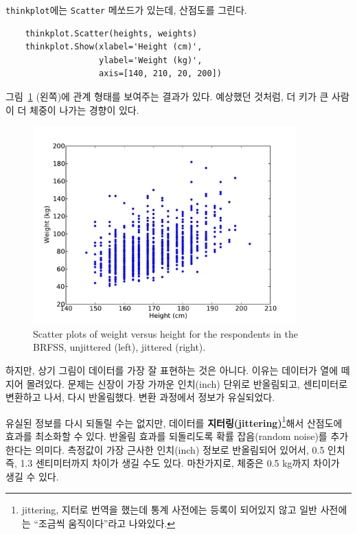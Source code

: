
{\tt thinkplot}에는 {\tt Scatter} 메쏘드가 있는데, 산점도를 그린다.
%
\begin{verbatim}
    thinkplot.Scatter(heights, weights)
    thinkplot.Show(xlabel='Height (cm)',
                   ylabel='Weight (kg)',
                   axis=[140, 210, 20, 200])
\end{verbatim}

그림~\ref{scatter1} (왼쪽)에 관계 형태를 보여주는 결과가 있다.
예상했던 것처럼, 더 키가 큰 사람이 더 체중이 나가는 경향이 있다.

\begin{figure}
\centerline{\includegraphics[height=3.0in]{figs/scatter1.pdf}}
\caption{Scatter plots of weight versus height for the respondents
in the BRFSS, unjittered (left), jittered (right).}
\label{scatter1}
\end{figure}

하지만, 상기 그림이 데이터를 가장 잘 표현하는 것은 아니다.
이유는 데이터가 열에 떼지어 몰려있다. 문제는 
신장이 가장 가까운 인치(inch) 단위로 반올림되고, 센티미터로 변환하고 나서,
다시 반올림했다. 변환 과정에서 정보가 유실되었다.


유실된 정보를 다시 되돌릴 수는 없지만, 데이터를 {\bf 지터링(jittering)}\footnote{jittering, 지터로 번역을 했는데 통계 사전에는 등록이 되어있지 않고 일반 사전에는 ``조금씩 움직이다''라고 나와있다.}해서 
산점도에 효과를 최소화할 수 있다. 반올림 효과를 되돌리도록 확률 잡음(random noise)를 추가한다는 의미다.
측정값이 가장 근사한 인치(inch) 정보로 반올림되어 있어서, 0.5 인치 즉, 1.3 센티미터까지 차이가 생길 수도 있다. 마찬가지로, 체중은 0.5 kg까지 차이가 생길 수 있다. 

